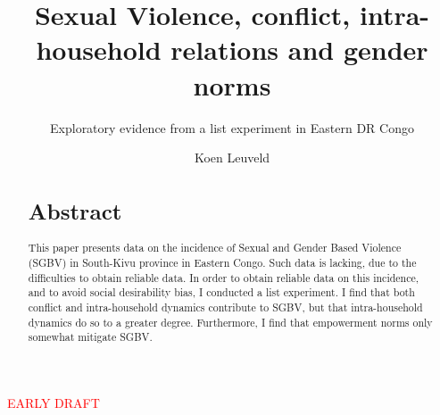 \documentclass[10pt,a4paper]{scrartcl} %
\begin{document}
\author{Koen Leuveld}




\title{Sexual Violence, conflict, intra-household relations and gender norms}
\subtitle{Exploratory evidence from a list experiment in Eastern DR Congo} %

\maketitle

\begin{center}
\textcolor{red}{\Large EARLY DRAFT}
\end{center}

\begin{abstract}
\section*{Abstract}
This paper presents data on the incidence of Sexual and Gender Based Violence (SGBV) in South-Kivu province in Eastern Congo. Such data is lacking, due to the difficulties to obtain reliable data. In order to obtain reliable data on this incidence, and to avoid social desirability bias, I conducted a list experiment. I find that both conflict and intra-household dynamics contribute to SGBV, but that intra-household dynamics do so to a greater degree. Furthermore, I find that empowerment norms only somewhat mitigate SGBV. 
\end{abstract}




\end{document}
